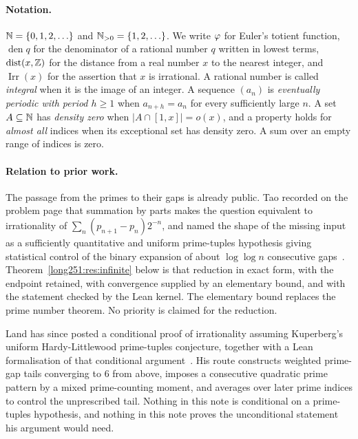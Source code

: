 \documentclass[11pt]{article}
\begin{document}
\paragraph{Notation.}
$\mathbb{N}=\{0,1,2,\ldots\}$ and $\mathbb{N}_{>0}=\{1,2,\ldots\}$.  We write $\varphi$ for Euler's
totient function, $\operatorname{den}q$ for the denominator of a rational
number $q$ written in lowest terms, $\operatorname{dist}(x,\mathbb{Z})$ for the
distance from a real number $x$ to the nearest integer, and
$\operatorname{Irr}(x)$ for the assertion that $x$ is irrational.  A rational
number is called \emph{integral} when it is the image of an integer.  A
sequence $(a_n)$ is \emph{eventually periodic with period $h\ge1$} when
$a_{n+h}=a_n$ for every sufficiently large $n$.  A set $A\subseteq\mathbb{N}$ has
\emph{density zero} when $|A\cap[1,x]|=o(x)$, and a property holds for
\emph{almost all} indices when its exceptional set has density zero.  A sum
over an empty range of indices is zero.

\paragraph{Relation to prior work.}
The passage from the primes to their gaps is already public.  Tao recorded on
the problem page that summation by parts makes the question equivalent to
irrationality of $\sum_n(p_{n+1}-p_n)2^{-n}$, and named the shape of the
missing input as a sufficiently quantitative and uniform prime-tuples
hypothesis giving statistical control of the binary expansion of about
$\log\log n$ consecutive gaps~\cite[comment of 7 October 2025]{erdosproblems251thread}.
Theorem~\ref{long251:res:infinite} below is that reduction in exact form, with the
endpoint retained, with convergence supplied by an elementary bound, and with
the statement checked by the Lean kernel.  The elementary bound replaces the
prime number theorem.  No priority is claimed for the reduction.

Land has since posted a conditional proof of irrationality assuming
Kuperberg's uniform Hardy-Littlewood prime-tuples conjecture, together with a
Lean formalisation of that conditional
argument~\cite[Conjecture~1 and \S1]{land2026}.  His route constructs weighted
prime-gap tails converging to $6$ from above, imposes a consecutive quadratic
prime pattern by a mixed prime-counting moment, and averages over later prime
indices to control the unprescribed tail.  Nothing in this note is
conditional on a prime-tuples hypothesis, and nothing in this note proves the
unconditional statement his argument would need.
\end{document}
